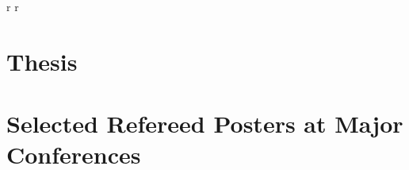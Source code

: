 \documentclass{article}
\begin{document}
\begin{refsegment}
  \nocite{las-2004-gridant}
  \nocite{las-2004-clade}
  \nocite{las-2004-adcom}
  \nocite{las-2004-abstracting}
  \nocite{las-2004-qos-ccgrid}

  \nocite{las-2003-reputation}
  \nocite{las-2003-qos}
  \nocite{las-2003-masses}
  \nocite{las-2003-ftp}
  \nocite{las-2003-dc}
  \nocite{las-2003-coalloc}
  \nocite{las-2003-chem}
  
  \nocite{las-2002-vision}
  \nocite{las-2002-pdcs}
  \nocite{las-2002-ocgsa}
  \nocite{las-2002-infogram}
  \nocite{las-2002-gcc}
  \nocite{las-2002-deploy}
  \nocite{las-2002-activetable}
  
  \nocite{las-2001-pse}
  \nocite{las-2001-hpdc-cactus}
  \nocite{las-2001-corba}
  \nocite{las-2001-greedy}  

  \nocite{las-2000-moba}
  \nocite{las-2000-grande}
  r \nocite{las-2000-mdsml}
  r \nocite{las-2000-ggf-schema}  

  \nocite{las-1999-spie}
  \nocite{las-1999-siam}
  \nocite{las-1999-rostock}
  \nocite{las-1998-hpdc}
  \nocite{las-1997-nobugs}
  \nocite{las-1997-hpdc}
  \nocite{las-1996-ecwmf}
  \nocite{las-1994-ecwmf}
  \nocite{las-1992-high}  
  \nocite{las-1991-icga}
  \nocite{las-1990-ppsn}
  \nocite{las-1990-natug}

  
\end{refsegment}


\pbib


\section{Thesis}


\begin{refsegment}

\nocite{las-1996-thesis}

\end{refsegment}

\pbib



\section{Selected Refereed Posters at Major Conferences}
\end{document}
